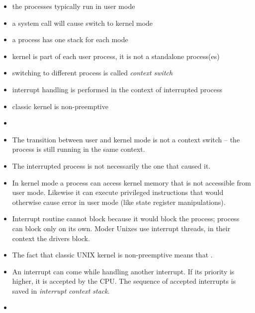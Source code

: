 
\begin{slide}
\begin{itemize}
\item the processes typically run in user mode
\item a system call will cause switch to kernel mode
\item a process has one stack for each mode
\item kernel is part of each user process, it is not a standalone process(es)
\item switching to different process is called \emph{context switch}
\item interrupt handling is performed in the context of interrupted process
\item classic kernel is non-preemptive
\end{itemize}
\end{slide}

\begin{itemize}
\item {}
\item The transition between user and kernel mode is not a context switch
-- the process is still running in the same context.
\item The interrupted process is not necessarily the one that caused it.
\item In kernel mode a process can access kernel memory that is not accessible
from user mode. Likewise it can execute privileged instructions that would
otherwise cause error in user mode (like state register manipulations).
\item Interrupt routine cannot block because it would block the process;
process can block only on its own. Moder Unixes use interrupt threads,
in their context the drivers  block.
\item The fact that classic UNIX kernel is non-preemptive means that
.
\item An interrupt can come while handling another interrupt. If its priority
is higher, it is accepted by the CPU. The sequence of accepted interrupts is
saved in \emph{interrupt context stack}.
\item {}
\end{itemize}

